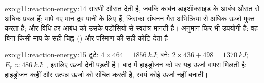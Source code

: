 \begin{solution}{exo:g11:reaction-energy:14}
सारणी औसत  देती है, जबकि कार्बन डाइऑक्साइड के  आबंध
औसत से अधिक प्रबल हैं; मापे गए मान द्रव पानी के लिए हैं,
जिसका संघनन गैस अभिक्रिया से अधिक ऊर्जा मुक्त करता है;
और विधि हर आबंध को उसके पड़ोसियों से स्वतंत्र मानती है। अनुमान फिर भी उपयोगी है:
वह बिना किसी माप के सही चिह्न () और परिमाण की
सही कोटि देता है।
\end{solution}

\begin{solution}{exo:g11:reaction-energy:15}
टूटे: $4 \times 464 = \qty{1856}{kJ}$; बने: $2 \times 436 + 498 =
\qty{1370}{kJ}$; $E_r \approx \qty{+486}{kJ}$: , इसलिए ऊर्जा
देनी पड़ती है। बाद में हाइड्रोजन को  पर यह ऊर्जा वापस मिलती है:
हाइड्रोजन कहीं और उत्पन्न ऊर्जा को संचित करती है, स्वयं कोई ऊर्जा नहीं बनाती।
\end{solution}

